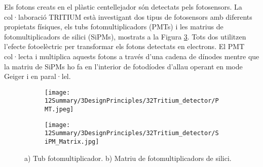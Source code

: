 Els fotons creats en el plàstic centellejador són detectats pels fotosensors. La col·laboració TRITIUM està investigant dos tipus de fotosensors amb diferents propietats físiques, els tubs fotomultiplicadors (PMTs) i les matrius de fotomultiplicadors de silici (SiPMs), mostrats a la Figura \ref{fig:Fotosensors}. Tots dos utilitzen l'efecte fotoelèctric per transformar els fotons detectats en electrons. El PMT col·lecta i multiplica aquests fotons a través d'una cadena de dínodes mentre que la matriu de SiPMs ho fa en l'interior de fotodíodes d'allau operant en mode Geiger i en paral·lel.

\begin{figure}[htpb]
\centering
    \begin{subfigure}[b]{0.4\textwidth}
    \centering
    \texttt{[image: 12Summary/3DesignPrinciples/32Tritium\_detector/PMT.jpeg]}  
    \caption{\label{subfig:PMT}}
    \end{subfigure}
    \hfill
    \begin{subfigure}[b]{0.4\textwidth}
    \centering
    \texttt{[image: 12Summary/3DesignPrinciples/32Tritium\_detector/SiPM\_Matrix.jpg]}  
    \caption{\label{subfig:SiPM}}
    \end{subfigure}
 \caption{a) Tub fotomultiplicador. b) Matriu de fotomultiplicadors de silici.}
 \label{fig:Fotosensors}
\end{figure}


